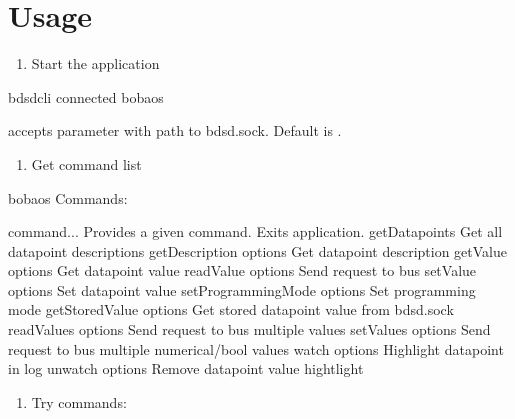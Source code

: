 \documentclass[letterpaper,10pt,english]{sphinxmanual}
\begin{document}
\section{Usage}
\label{\detokenize{bdsd-cli:usage}}\label{\detokenize{bdsd-cli:usage}}\begin{enumerate}
\item {} 
Start the application

\end{enumerate}

%
\begin{sphinxVerbatim}[commandchars=\\\{\}]
\PYGZdl{} bdsd\PYGZhy{}cli
connected
bobaos\PYGZgt{}
\end{sphinxVerbatim}

 accepts  parameter with path to bdsd.sock. Default is .
\begin{enumerate}
\item {} 
Get command list

\end{enumerate}

%
\begin{sphinxVerbatim}[commandchars=\\\{\}]
bobaos\PYGZgt{} 
  Commands:

       \PYG{o}{[}command...\PYG{o}{]}              Provides   a given command.
                                 Exits application.
      getDatapoints                  Get all datapoint descriptions
      getDescription \PYG{o}{[}options\PYG{o}{]}       Get datapoint description
      getValue \PYG{o}{[}options\PYG{o}{]}             Get datapoint value
      readValue \PYG{o}{[}options\PYG{o}{]}            Send  request to bus
      setValue \PYG{o}{[}options\PYG{o}{]}             Set datapoint value
      setProgrammingMode \PYG{o}{[}options\PYG{o}{]}   Set programming mode
      getStoredValue \PYG{o}{[}options\PYG{o}{]}       Get stored datapoint value from bdsd.sock
      readValues \PYG{o}{[}options\PYG{o}{]}           Send  request to bus  multiple values
      setValues \PYG{o}{[}options\PYG{o}{]}            Send  request to bus  multiple numerical/bool values
      watch \PYG{o}{[}options\PYG{o}{]}                Highlight datapoint in log
      unwatch \PYG{o}{[}options\PYG{o}{]}              Remove datapoint value hightlight
\end{sphinxVerbatim}
\begin{enumerate}
\item {} 
Try commands:

\end{enumerate}
\end{document}
